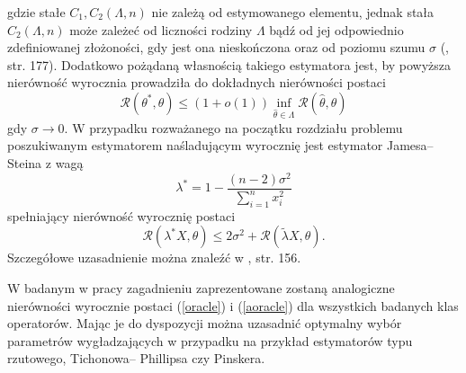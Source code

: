 \documentclass[man,mfiu]{mgrwms}
\begin{document}
gdzie stałe $C_1,C_2(\Lambda,n)$ nie zależą od estymowanego elementu, jednak stała $C_2(\Lambda,n)$ może zależeć od liczności rodziny $\Lambda$ bądź od jej odpowiednio zdefiniowanej złożoności, gdy jest ona nieskończona oraz od poziomu szumu $\sigma$ (\cite{mitchell}, str. 177). Dodatkowo pożądaną własnością takiego estymatora jest, by powyższa nierówność wyrocznia prowadziła do dokładnych nierówności postaci
\begin{equation}\label{aoracle}
\mathcal{R}(\theta^*,\theta)\leq(1+o(1))\inf_{\hat{\theta} \in \Lambda}\mathcal{R}(\hat{\theta},\theta)
\end{equation}
gdy $\sigma\to 0$. W przypadku rozważanego na początku rozdziału problemu poszukiwanym estymatorem naśladującym wyrocznię jest estymator Jamesa-- Steina z wagą
\begin{displaymath}
\lambda^*=1-\frac{(n-2)\sigma^2}{\sum_{i=1}^nx_i^2}
\end{displaymath}
spełniający nierówność wyrocznię postaci
\begin{displaymath}
\mathcal{R}(\lambda^*X,\theta)\leq 2\sigma^2+\mathcal{R}(\tilde{\lambda} X,\theta).
\end{displaymath}
Szczegółowe uzasadnienie można znaleźć w \cite{wasserman}, str. 156.

W badanym w pracy zagadnieniu zaprezentowane zostaną analogiczne nierówności wyrocznie postaci (\ref{oracle}) i (\ref{aoracle}) dla wszystkich badanych klas operatorów. Mając je do dyspozycji można uzasadnić optymalny wybór parametrów wygładzających w przypadku na przykład estymatorów typu rzutowego, Tichonowa-- Phillipsa czy Pinskera.\\
\end{document}
